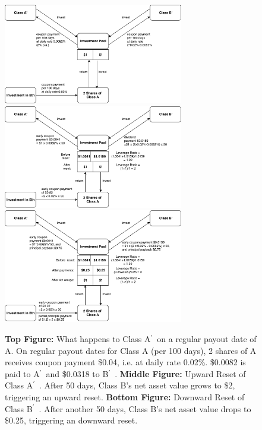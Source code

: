 \documentclass[11pt]{article}%
\numberwithin{equation}{section}
\theoremstyle{plain}
\newcommand{\Ap}{A\ensuremath{^\prime}~}
\newcommand{\Bp}{B\ensuremath{^\prime}~}
\begin{document}
\begin{figure}[p]
\centering
	\includegraphics[width=0.7\textwidth]{Ap_periodic}
	\vspace{1em}
	\includegraphics[width=0.7\textwidth]{Ap_upward}
	\vspace{1em}
	\includegraphics[width=0.7\textwidth]{Ap_downward}
	\caption{{\bf Top Figure:} What happens to Class \Ap on a regular payout date of A. On regular payout dates for Class A (per 100 days), 2 shares of A receives coupon payment \$0.04, i.e. at daily rate 0.02\%. \$0.0082 is paid to \Ap and \$0.0318 to \Bp. {\bf Middle Figure:} Upward Reset of Class \Ap. After 50 days, Class B's net asset value grows to \$2, triggering an upward reset. {\bf Bottom Figure:} Downward Reset of Class \Bp. After another 50 days, Class B's net asset value drops to \$0.25, triggering an downward reset. }\label{fig:Ap}
\end{figure}
\end{document}
